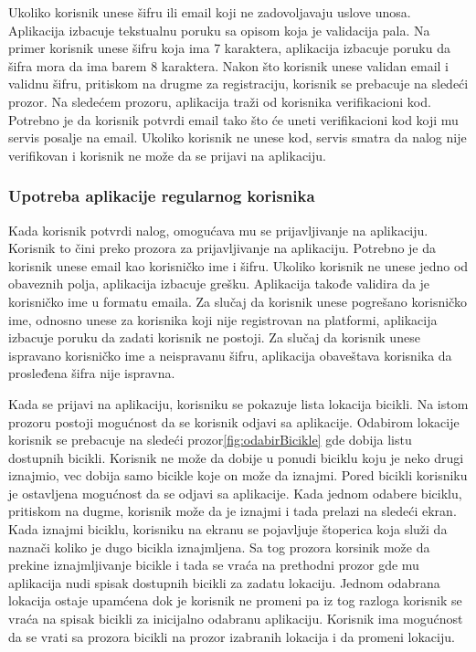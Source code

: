\documentclass[12pt,oneside]{memoir}
\begin{document}
 
Ukoliko korisnik unese šifru ili email koji ne zadovoljavaju uslove unosa. Aplikacija izbacuje tekstualnu poruku sa opisom koja je validacija pala. Na primer korisnik unese šifru koja ima 7 karaktera, aplikacija izbacuje poruku da šifra mora da ima barem 8 karaktera. Nakon što korisnik unese validan email i validnu šifru, pritiskom na drugme za registraciju, korisnik se prebacuje na sledeći prozor. Na sledećem prozoru, aplikacija traži od korisnika verifikacioni kod. Potrebno je da korisnik potvrdi email tako što će uneti verifikacioni kod koji mu servis posalje na email. Ukoliko korisnik ne unese kod, servis smatra da nalog nije verifikovan i korisnik ne može da se prijavi na aplikaciju.
 
\subsubsection{Upotreba aplikacije regularnog korisnika}
 
Kada korisnik potvrdi nalog, omogućava mu se prijavljivanje na aplikaciju. Korisnik to čini preko prozora za prijavljivanje na aplikaciju. Potrebno je da korisnik unese email kao korisničko ime i šifru. Ukoliko korisnik ne unese jedno od obaveznih polja, aplikacija izbacuje grešku. Aplikacija takođe validira da je korisničko ime u formatu emaila. Za slučaj da korisnik unese pogrešano korisničko ime, odnosno unese za korisnika koji nije registrovan na platformi, aplikacija izbacuje poruku da zadati korisnik ne postoji. Za slučaj da korisnik unese ispravano korisničko ime a neispravanu šifru, aplikacija obaveštava korisnika da prosleđena šifra nije ispravna.
 
Kada se prijavi na aplikaciju, korisniku se pokazuje lista lokacija bicikli. Na istom prozoru postoji mogućnost da se korisnik odjavi sa aplikacije. Odabirom lokacije korisnik se prebacuje na sledeći prozor\ref{fig:odabirBicikle} gde dobija listu dostupnih bicikli. Korisnik ne može da dobije u ponudi biciklu koju je neko drugi iznajmio, vec dobija samo bicikle koje on može da iznajmi. Pored bicikli korisniku je ostavljena mogućnost da se odjavi sa aplikacije. Kada jednom odabere biciklu, pritiskom na dugme, korisnik može da je iznajmi i tada prelazi na sledeći ekran. Kada iznajmi biciklu, korisniku na ekranu se pojavljuje štoperica koja služi da naznači koliko je dugo bicikla iznajmljena. Sa tog prozora korsinik može da prekine iznajmljivanje bicikle i tada se vraća na prethodni prozor gde mu aplikacija nudi spisak dostupnih bicikli za zadatu lokaciju. Jednom odabrana lokacija ostaje upamćena dok je korisnik ne promeni pa iz tog razloga korisnik se vraća na spisak bicikli za inicijalno odabranu aplikaciju. Korisnik ima mogućnost da se vrati sa prozora bicikli na prozor izabranih lokacija i da promeni lokaciju.
 
\end{document}
